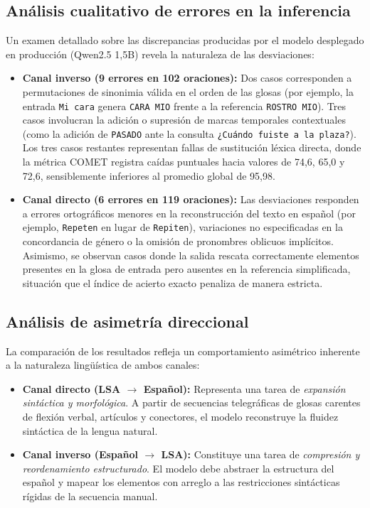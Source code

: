 \subsection{Análisis cualitativo de errores en la inferencia}
Un examen detallado sobre las discrepancias producidas por el modelo desplegado en producción (Qwen2.5 1{,}5B) revela la naturaleza de las desviaciones:
\begin{itemize}
    \item \textbf{Canal inverso (9 errores en 102 oraciones):}
    Dos casos corresponden a permutaciones de sinonimia válida en el orden de las glosas (por ejemplo, la entrada \texttt{Mi cara} genera \texttt{CARA MIO} frente a la referencia \texttt{ROSTRO MIO}). Tres casos involucran la adición o supresión de marcas temporales contextuales (como la adición de \texttt{PASADO} ante la consulta \texttt{¿Cuándo fuiste a la plaza?}). Los tres casos restantes representan fallas de sustitución léxica directa, donde la métrica COMET registra caídas puntuales hacia valores de 74{,}6, 65{,}0 y 72{,}6, sensiblemente inferiores al promedio global de 95{,}98.
    \item \textbf{Canal directo (6 errores en 119 oraciones):}
    Las desviaciones responden a errores ortográficos menores en la reconstrucción del texto en español (por ejemplo, \texttt{Repeten} en lugar de \texttt{Repiten}), variaciones no especificadas en la concordancia de género o la omisión de pronombres oblicuos implícitos. Asimismo, se observan casos donde la salida rescata correctamente elementos presentes en la glosa de entrada pero ausentes en la referencia simplificada, situación que el índice de acierto exacto penaliza de manera estricta.
\end{itemize}

\subsection{Análisis de asimetría direccional}
La comparación de los resultados refleja un comportamiento asimétrico inherente a la naturaleza lingüística de ambos canales:
\begin{itemize}
    \item \textbf{Canal directo (LSA $\rightarrow$ Español):} Representa una tarea de \textit{expansión sintáctica y morfológica}. A partir de secuencias telegráficas de glosas carentes de flexión verbal, artículos y conectores, el modelo reconstruye la fluidez sintáctica de la lengua natural.
    \item \textbf{Canal inverso (Español $\rightarrow$ LSA):} Constituye una tarea de \textit{compresión y reordenamiento estructurado}. El modelo debe abstraer la estructura del español y mapear los elementos con arreglo a las restricciones sintácticas rígidas de la secuencia manual.
\end{itemize}


